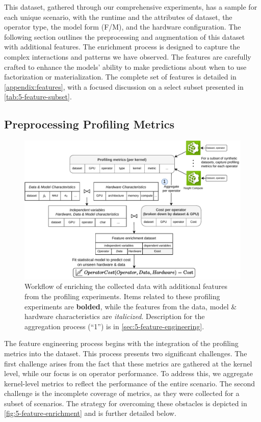 This dataset, gathered through our comprehensive experiments, has a sample for each unique scenario, with the runtime and the attributes of dataset, the operator type, the model form (F/M), and the hardware configuration. The following section outlines the preprocessing and augmentation of this dataset with additional features. The enrichment process is designed to capture the complex interactions and patterns we have observed. The features are carefully crafted to enhance the models' ability to make predictions about when to use factorization or materialization. The complete set of features is detailed in \autoref{appendix:features}, with a focused discussion on a select subset presented in \autoref{tab:5-feature-subset}.

\subsection{Preprocessing Profiling Metrics}
\begin{figure}[ht]
  \centering
  \includegraphics[width=\linewidth]{chapters/05_cost_estimation/figures/feature-engineering.pdf}
  \caption[Feature enrichment workflow]{Workflow of enriching the collected data with additional features from the profiling experiments. Items related to these profiling experiments are \textbf{bolded}, while the features from the data, model \& hardware characteristics are \textit{italicized}. Description for the aggregation process (“1”) is in \autoref{sec:5-feature-engineering}.}
  \label{fig:5-feature-enrichment}
\end{figure}
The feature engineering process begins with the integration of the profiling metrics into the dataset. This process presents two significant challenges. The first challenge arises from the fact that these metrics are gathered at the kernel level, while our focus is on operator performance. To address this, we aggregate kernel-level metrics to reflect the performance of the entire scenario. The second challenge is the incomplete coverage of metrics, as they were collected for a subset of scenarios. The strategy for overcoming these obstacles is depicted in \autoref{fig:5-feature-enrichment} and is further detailed below.

